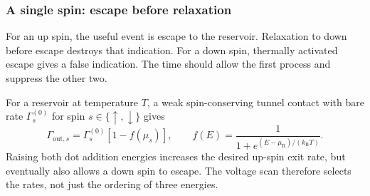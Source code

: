 \subsubsection{A single spin: escape before relaxation}
For an up spin, the useful event is escape to the reservoir.
Relaxation to down before escape destroys that indication.
For a down spin, thermally activated escape gives a false indication.
The time should allow the first process and suppress the other two.

For a reservoir at temperature $T$, a weak spin-conserving tunnel
contact with bare rate $\Gamma_s^{(0)}$ for spin
$s\in\{\uparrow,\downarrow\}$ gives
\begin{equation}
 \Gamma_{\mathrm{out},s}
 =\Gamma_s^{(0)}[1-f(\mu_s)],\qquad
 f(E)=\frac{1}{1+e^{(E-\mu_{\mathrm R})/(k_{\mathrm B}T)}}.
 \label{eq:calibration-spin-exit-rates}
\end{equation}
Raising both dot addition energies increases the desired up-spin
exit rate, but eventually also allows a down spin to escape.
The voltage scan therefore selects the rates, not just the ordering
of three energies.

